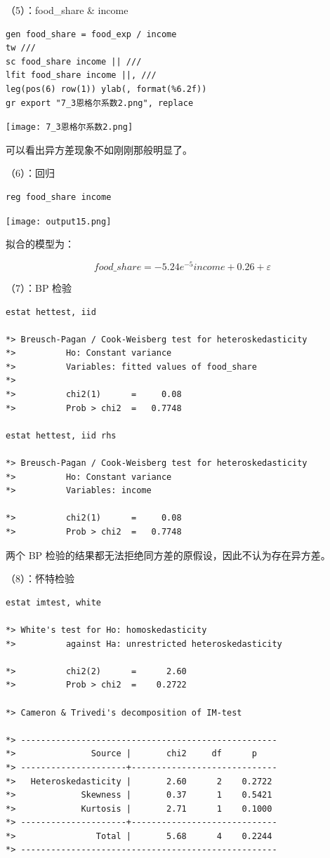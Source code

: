 \documentclass[cn,fancy,blue,11pt]{elegantbook}
\begin{document}
（5）：food\_share \& income

\begin{lstlisting}
gen food_share = food_exp / income
tw ///
sc food_share income || ///
lfit food_share income ||, ///
leg(pos(6) row(1)) ylab(, format(%6.2f))
gr export "7_3恩格尔系数2.png", replace
\end{lstlisting}


\noindent\texttt{[image: 7\_3恩格尔系数2.png]}

可以看出异方差现象不如刚刚那般明显了。

（6）：回归

\begin{lstlisting}
reg food_share income
\end{lstlisting}

\noindent\texttt{[image: output15.png]}

拟合的模型为：

\begin{equation}
  food\_share = -5.24e^{-5}income + 0.26 + \varepsilon
\end{equation}

（7）：BP 检验

\begin{lstlisting}
estat hettest, iid

*> Breusch-Pagan / Cook-Weisberg test for heteroskedasticity
*>          Ho: Constant variance
*>          Variables: fitted values of food_share
*>
*>          chi2(1)      =     0.08
*>          Prob > chi2  =   0.7748

estat hettest, iid rhs

*> Breusch-Pagan / Cook-Weisberg test for heteroskedasticity
*>          Ho: Constant variance
*>          Variables: income

*>          chi2(1)      =     0.08
*>          Prob > chi2  =   0.7748
\end{lstlisting}

两个 BP 检验的结果都无法拒绝同方差的原假设，因此不认为存在异方差。

（8）：怀特检验

\begin{lstlisting}
estat imtest, white

*> White's test for Ho: homoskedasticity
*>          against Ha: unrestricted heteroskedasticity

*>          chi2(2)      =      2.60
*>          Prob > chi2  =    0.2722

*> Cameron & Trivedi's decomposition of IM-test

*> ---------------------------------------------------
*>               Source |       chi2     df      p
*> ---------------------+-----------------------------
*>   Heteroskedasticity |       2.60      2    0.2722
*>             Skewness |       0.37      1    0.5421
*>             Kurtosis |       2.71      1    0.1000
*> ---------------------+-----------------------------
*>                Total |       5.68      4    0.2244
*> ---------------------------------------------------
\end{lstlisting}
\end{document}
